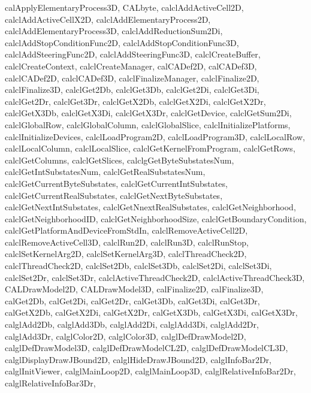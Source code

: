 {{    calApplyElementaryProcess3D,
    CALbyte,
    calclAddActiveCell2D,
    calclAddActiveCellX2D,
    calclAddElementaryProcess2D,
    calclAddElementaryProcess3D,
    calclAddReductionSum2Di,
    calclAddStopConditionFunc2D,
    calclAddStopConditionFunc3D,
    calclAddSteeringFunc2D,
    calclAddSteeringFunc3D,
    calclCreateBuffer,
    calclCreateContext,
    calclCreateManager,
    calCADef2D,
    calCADef3D,
    calclCADef2D,
    calclCADef3D,
    calclFinalizeManager,
    calclFinalize2D,
    calclFinalize3D,
    calclGet2Db,
    calclGet3Db,
    calclGet2Di,
    calclGet3Di,
    calclGet2Dr,
    calclGet3Dr,
    calclGetX2Db,
    calclGetX2Di,
    calclGetX2Dr,
    calclGetX3Db,
    calclGetX3Di,
    calclGetX3Dr,
    calclGetDevice,
    calclGetSum2Di,
    calclGlobalRow,
    calclGlobalColumn,
    calclGlobalSlice,
    calclInitializePlatforms,
    calclInitializeDevices,
    calclLoadProgram2D,
    calclLoadProgram3D,
    calclLocalRow,
    calclLocalColumn,
    calclLocalSlice,
    calclGetKernelFromProgram,
    calclGetRows,
    calclGetColumns,
    calclGetSlices,
    calclgGetByteSubstatesNum,
    calclGetIntSubstatesNum,
    calclGetRealSubstatesNum,
    calclGetCurrentByteSubstates,
    calclGetCurrentIntSubstates,
    calclGetCurrentRealSubstates,
    calclGetNextByteSubstates,
    calclGetNextIntSubstates,
    calclGetNnextRealSubstates,
    calclGetNeighborhood,
    calclGetNeighborhoodID,
    calclGetNeighborhoodSize,
    calclGetBoundaryCondition,
    calclGetPlatformAndDeviceFromStdIn,
    calclRemoveActiveCell2D,
    calclRemoveActiveCell3D,
    calclRun2D,
    calclRun3D,
    calclRunStop,
    calclSetKernelArg2D,
    calclSetKernelArg3D,
    calclThreadCheck2D,
    calclThreadCheck2D,
    calclSet2Db,
    calclSet3Db,
    calclSet2Di,
    calclSet3Di,
    calclSet2Dr,
    calclSet3Dr,
    calclActiveThreadCheck2D,
    calclActiveThreadCheck3D,
    CALDrawModel2D,
    CALDrawModel3D,
    calFinalize2D,
    calFinalize3D,
    calGet2Db,
    calGet2Di,
    calGet2Dr,
    calGet3Db,
    calGet3Di,
    calGet3Dr,
    calGetX2Db,
    calGetX2Di,
    calGetX2Dr,
    calGetX3Db,
    calGetX3Di,
    calGetX3Dr,
    calglAdd2Db,
    calglAdd3Db,
    calglAdd2Di,
    calglAdd3Di,
    calglAdd2Dr,
    calglAdd3Dr,
    calglColor2D,
    calglColor3D,
    calglDefDrawModel2D,
    calglDefDrawModel3D,
    calglDefDrawModelCL2D,
    calglDefDrawModelCL3D,
    calglDisplayDrawJBound2D,
    calglHideDrawJBound2D,
    calglInfoBar2Dr,
    calglInitViewer,
    calglMainLoop2D,
    calglMainLoop3D,
    calglRelativeInfoBar2Dr,
    calglRelativeInfoBar3Dr,
}}
